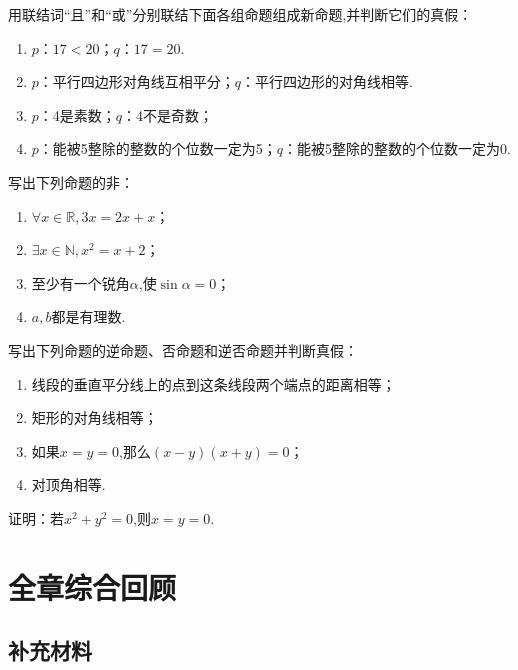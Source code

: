 \documentclass[lang=cn,math=cm,chinesefont=nofont,11pt,scheme=chinese,twocol]{elegantbook}
\begin{document}
\begin{exercise}
  用联结词“且”和“或”分别联结下面各组命题组成新命题,并判断它们的真假：
\end{exercise}

\begin{enumerate}
  \item $p$：$17<20$；$q$：$17=20$.
  \item $p$：平行四边形对角线互相平分；$q$：平行四边形的对角线相等.
  \item $p$：4是素数；$q$：4不是奇数；
  \item $p$：能被5整除的整数的个位数一定为5；$q$：能被5整除的整数的个位数一定为0.
\end{enumerate}

\begin{exercise}
  写出下列命题的非：
\end{exercise}

\begin{enumerate}
  \item $\forall x\in\mathbb{R},3x=2x+x$；
  \item $\exists x\in\mathbb{N},x^2=x+2$；
  \item 至少有一个锐角$\alpha$,使$\sin\alpha=0$；
  \item $a,b$都是有理数.
\end{enumerate}

\begin{exercise}
  写出下列命题的逆命题、否命题和逆否命题并判断真假：
\end{exercise}

\begin{enumerate}
  \item 线段的垂直平分线上的点到这条线段两个端点的距离相等；
  \item 矩形的对角线相等；
  \item 如果$x=y=0$,那么$(x-y)(x+y)=0$；
  \item 对顶角相等.
\end{enumerate}

\begin{exercise}\label{2003RJA_xx2-1_P7.exp4}
  证明：若$x^2+y^2=0$,则$x=y=0$.
\end{exercise}

\section{全章综合回顾}

\subsection{补充材料}
\end{document}

